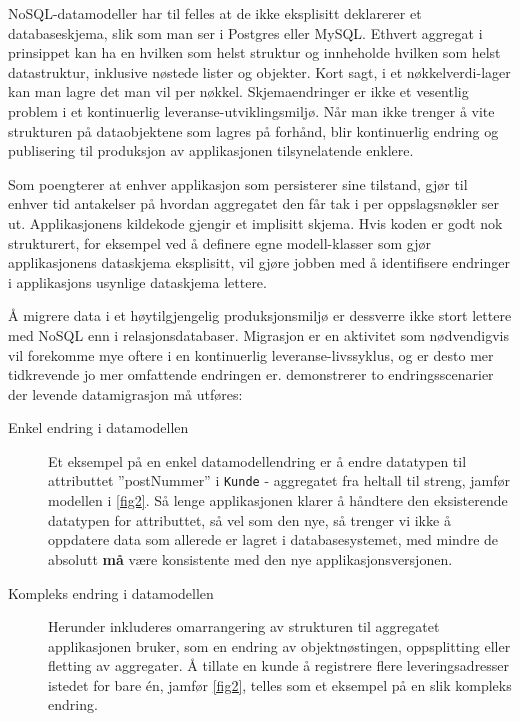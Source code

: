 NoSQL-datamodeller har til felles at de ikke eksplisitt deklarerer et databaseskjema, slik som man ser i Postgres eller MySQL. Ethvert aggregat i prinsippet kan ha en hvilken som helst struktur og innheholde hvilken som helst datastruktur, inklusive nøstede lister og objekter. Kort sagt, i et nøkkelverdi-lager kan man lagre det man vil per nøkkel. Skjemaendringer er ikke et vesentlig problem i et kontinuerlig leveranse-utviklingsmiljø. Når man ikke trenger å vite strukturen på dataobjektene som lagres på forhånd, blir kontinuerlig endring og publisering til produksjon av applikasjonen tilsynelatende enklere.

Som \cite{sadalage2013} poengterer at enhver applikasjon som persisterer sine tilstand, gjør til enhver tid antakelser på hvordan aggregatet den får tak i per oppslagsnøkler ser ut. Applikasjonens kildekode gjengir et implisitt skjema. Hvis koden er godt nok strukturert, for eksempel ved å definere egne modell-klasser som gjør applikasjonens dataskjema eksplisitt, vil gjøre jobben med å identifisere endringer i applikasjons usynlige dataskjema lettere.

Å migrere data i et høytilgjengelig produksjonsmiljø er dessverre ikke stort lettere med NoSQL enn i relasjonsdatabaser. Migrasjon er en aktivitet som nødvendigvis vil forekomme mye oftere i en kontinuerlig leveranse-livssyklus, og er desto mer tidkrevende jo mer omfattende endringen er. \cite{hauer2015} demonstrerer to endringsscenarier der levende datamigrasjon må utføres:

\begin{description}
  \item [Enkel endring i datamodellen] Et eksempel på en enkel datamodellendring er å endre datatypen til attributtet ''postNummer'' i \texttt{Kunde} - aggregatet fra heltall til streng, jamfør modellen i \ref{fig2}. Så lenge applikasjonen klarer å håndtere den eksisterende datatypen for attributtet, så vel som den nye, så trenger vi ikke å oppdatere data som allerede er lagret i databasesystemet, med mindre de absolutt \textbf{må} være konsistente med den nye applikasjonsversjonen.
  \item [Kompleks endring i datamodellen] Herunder inkluderes omarrangering av strukturen til aggregatet applikasjonen bruker, som en endring av objektnøstingen, oppsplitting eller fletting av aggregater. Å tillate en kunde å registrere flere leveringsadresser istedet for bare én, jamfør \ref{fig2}, telles som et eksempel på en slik kompleks endring.
\end{description}

